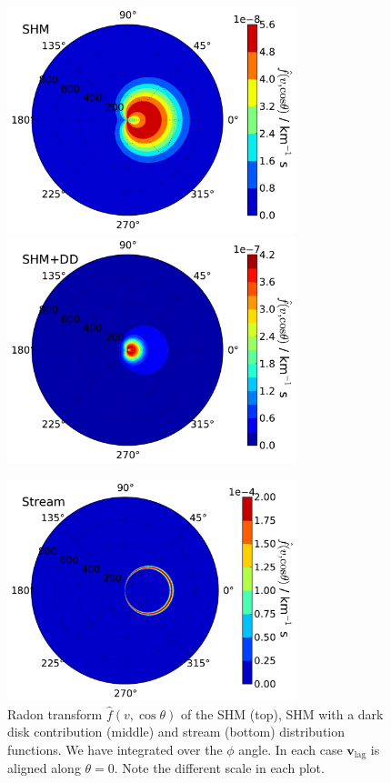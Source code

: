 \begin{figure}[pht!]
  \centering
  \includegraphics[width=0.75\textwidth]{Directional/SHMRadonpolar.pdf}
  \includegraphics[width=0.75\textwidth]{Directional/SHMDDRadonpolar.pdf}

  \includegraphics[width=0.75\textwidth]{Directional/STREAMRadonpolar.pdf}

\caption[Radon transform examples]{Radon transform $\hat{f}(v, \cos\theta)$ of the SHM (top), SHM with a dark disk contribution (middle) and stream (bottom) distribution functions. We have integrated over the $\phi$ angle. In each case $\mathbf{v}_\textrm{lag}$ is aligned along $\theta = 0$. Note the different scale in each plot.}
  \label{fig:directional:Radon}
\end{figure}


